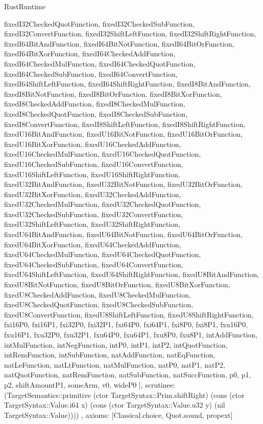 \begin{lexlean}{RustRuntime}
\begin{semanticmodule}
{{      fixedI32CheckedQuotFunction,
      fixedI32CheckedSubFunction,
      fixedI32ConvertFunction,
      fixedI32ShiftLeftFunction,
      fixedI32ShiftRightFunction,
      fixedI64BitAndFunction,
      fixedI64BitNotFunction,
      fixedI64BitOrFunction,
      fixedI64BitXorFunction,
      fixedI64CheckedAddFunction,
      fixedI64CheckedMulFunction,
      fixedI64CheckedQuotFunction,
      fixedI64CheckedSubFunction,
      fixedI64ConvertFunction,
      fixedI64ShiftLeftFunction,
      fixedI64ShiftRightFunction,
      fixedI8BitAndFunction,
      fixedI8BitNotFunction,
      fixedI8BitOrFunction,
      fixedI8BitXorFunction,
      fixedI8CheckedAddFunction,
      fixedI8CheckedMulFunction,
      fixedI8CheckedQuotFunction,
      fixedI8CheckedSubFunction,
      fixedI8ConvertFunction,
      fixedI8ShiftLeftFunction,
      fixedI8ShiftRightFunction,
      fixedU16BitAndFunction,
      fixedU16BitNotFunction,
      fixedU16BitOrFunction,
      fixedU16BitXorFunction,
      fixedU16CheckedAddFunction,
      fixedU16CheckedMulFunction,
      fixedU16CheckedQuotFunction,
      fixedU16CheckedSubFunction,
      fixedU16ConvertFunction,
      fixedU16ShiftLeftFunction,
      fixedU16ShiftRightFunction,
      fixedU32BitAndFunction,
      fixedU32BitNotFunction,
      fixedU32BitOrFunction,
      fixedU32BitXorFunction,
      fixedU32CheckedAddFunction,
      fixedU32CheckedMulFunction,
      fixedU32CheckedQuotFunction,
      fixedU32CheckedSubFunction,
      fixedU32ConvertFunction,
      fixedU32ShiftLeftFunction,
      fixedU32ShiftRightFunction,
      fixedU64BitAndFunction,
      fixedU64BitNotFunction,
      fixedU64BitOrFunction,
      fixedU64BitXorFunction,
      fixedU64CheckedAddFunction,
      fixedU64CheckedMulFunction,
      fixedU64CheckedQuotFunction,
      fixedU64CheckedSubFunction,
      fixedU64ConvertFunction,
      fixedU64ShiftLeftFunction,
      fixedU64ShiftRightFunction,
      fixedU8BitAndFunction,
      fixedU8BitNotFunction,
      fixedU8BitOrFunction,
      fixedU8BitXorFunction,
      fixedU8CheckedAddFunction,
      fixedU8CheckedMulFunction,
      fixedU8CheckedQuotFunction,
      fixedU8CheckedSubFunction,
      fixedU8ConvertFunction,
      fixedU8ShiftLeftFunction,
      fixedU8ShiftRightFunction,
      fxi16P0,
      fxi16P1,
      fxi32P0,
      fxi32P1,
      fxi64P0,
      fxi64P1,
      fxi8P0,
      fxi8P1,
      fxu16P0,
      fxu16P1,
      fxu32P0,
      fxu32P1,
      fxu64P0,
      fxu64P1,
      fxu8P0,
      fxu8P1,
      intAddFunction,
      intMulFunction,
      intNegFunction,
      intP0,
      intP1,
      intP2,
      intQuotFunction,
      intRemFunction,
      intSubFunction,
      natAddFunction,
      natEqFunction,
      natLeFunction,
      natLtFunction,
      natMulFunction,
      natP0,
      natP1,
      natP2,
      natQuotFunction,
      natRemFunction,
      natSubFunction,
      natSuccFunction,
      p0,
      p1,
      p2,
      shiftAmountP1,
      someArm,
      v0,
      wideP0
    ],
    scrutinee: (TargetSemantics::primitive (ctor TargetSyntax::Prim.shiftRight) (cons (ctor TargetSyntax::Value.i64 x) (cons (ctor TargetSyntax::Value.u32 y) (nil TargetSyntax::Value))))
  },
  axioms: [Classical.choice, Quot.sound, propext]
}


\end{semanticmodule}
\end{lexlean}
